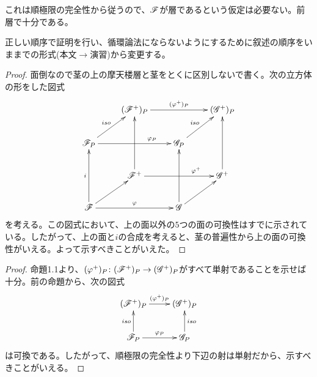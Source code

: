 \begin{rem}
  これは順極限の完全性から従うので、$\mathscr{F}$が層であるという仮定は必要ない。前層で十分である。
\end{rem}


\begin{rem}
正しい順序で証明を行い、循環論法にならないようにするために叙述の順序をいままでの形式(本文$\to$演習)から変更する。
\end{rem}

\begin{proof}
面倒なので茎の上の摩天楼層と茎をとくに区別しないで書く。次の立方体の形をした図式
\[
\xymatrix{
{}  & (\scrf^+)_P \ar[rr]^-{(\vp^+)_P } & {} & (\scrg^+)_P \\
\scrf_P \ar[ru]^-{iso}  \ar[rr]^(.7){\vp_P} & { } & \scrg_P \ar[ru]^-{iso} & {} \\
{} & \scrf^+ \ar[uu] \ar[rr]^(.7){\vp^+} & { } & \scrg^+ \ar[uu] \\
\scrf \ar[uu]^-i \ar[rr]^-{\vp} \ar[ru] & {} & \scrg \ar[uu] \ar[ru]
}
\]
を考える。この図式において、上の面以外の$5$つの面の可換性はすでに示されている。したがって、上の面と$i$の合成を考えると、茎の普遍性から上の面の可換性がいえる。よって示すべきことがいえた。
\end{proof}


\begin{proof}
命題1.1より、$({\varphi}^{+})_P \colon (\mathscr{F}^+ )_P \to (\mathscr{G}^+)_P$がすべて単射であることを示せば十分。前の命題から、次の図式
\[
\xymatrix{
(\scrf^+)_P \ar[r]^-{(\vp^+)_P} & (\scrg^+)_P \\
\scrf_P \ar[r]^-{\vp_P} \ar[u]^-{iso} & \scrg_P \ar[u]_-{iso}
}
\]
は可換である。したがって、順極限の完全性より下辺の射は単射だから、示すべきことがいえる。
\end{proof}


